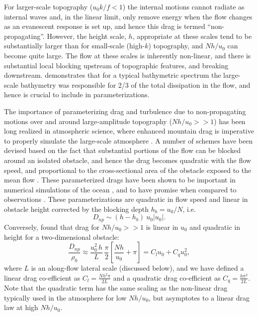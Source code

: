 \documentclass[twocol]{ametsocV5}
\begin{document}
For larger-scale topography ($u_0k/f<1$) the internal motions cannot radiate as internal waves and, in the linear limit, only remove energy when the flow changes as an evanescent response is set up, and hence this drag is termed ``non-propagating''.  However, the height scale, $h$, appropriate at these scales tend to be substantially larger than for small-scale (high-$k$) topography, and $Nh/u_0$ can become quite large.  The flow at these scales is inherently non-linear, and there is substantial local blocking upstream of topographic features, and breaking downstream. \citet{klymak18} demonstrates that for a typical bathymetric spectrum  \citep[i.e.\ the ones used by][]{nikurashinferrari14} the large-scale bathymetry was responsible for 2/3 of the total dissipation in the flow, and hence is crucial to include in parameterizations.

The importance of parameterizing drag and turbulence due to non-propagating motions over and around large-amplitude topography ($Nh/u_0 >> 1$) has been long realized in atmospheric science, where enhanced mountain drag is imperative to properly simulate the large-scale atmosphere \citep[i.e.][]{bacmeisterpierrhumbert88,LottMiller97}.  A number of schemes have been devised based on the fact that substantial portions of the flow can be blocked around an isolated obstacle, and hence the drag becomes quadratic with the flow speed, and proportional to the cross-sectional area of the obstacle exposed to the mean flow \citep[i.e.][]{ScinoccaMcFarlane00, Garner05}.  These parameterized drags have been shown to be important in numerical simulations of the ocean \citep{trossmanetal13,trossmanetal2016}, and to have promise when compared to observations \citep{TrossmanEtAl15}.  These parameterizations are quadratic in flow speed and linear in obstacle height corrected by the blocking depth $h_b = u_0/N$, i.e.
\begin{equation}
    D_{np} \sim (h-h_b)\ u_0 \left|u_0\right|.
\end{equation}
Conversely, \citep{klymaketal10a} found that drag for $Nh/u_0 >> 1$ is linear in $u_0$ and quadratic in height for a two-dimensional obstacle:
\begin{equation}
    \frac{D_{np}}{\rho_0} \approx \frac{u_0^2\, h}{L}\, \frac{\pi}{2}\left[\frac{N h}{u_0}+ \pi\right] = C_l u_0 + C_q u_0^2,
    \label{eq:FormDragParam}
\end{equation}
where $L$ is an along-flow lateral scale (discussed below), and we have defined a linear drag co-efficient as $C_l = \frac{N h^2\pi}{2L}$ and a quadratic drag co-efficient as $C_q = \frac{h\pi^2}{2L}$.  Note that the quadratic  term has the same scaling as the non-linear drag typically used in the atmosphere for low $Nh/u_0$, but asymptotes to a linear drag law at high $Nh/u_0$.  
\end{document}
